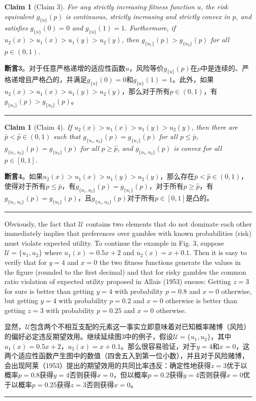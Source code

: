 \documentclass[12pt,a4paper]{article}
\newenvironment{original}
  {\par\noindent\color{black}\smallskip}
  {\par\smallskip}
\newenvironment{translation}
  {\par\noindent\color{blue!70!black}\smallskip}
  {\par\medskip\hrule\medskip}
\newtheorem{claim}[theorem]{Claim}
\begin{document}
\begin{claim}[Claim 3]
For any strictly increasing fitness function $u$, the risk equivalent $g_{\{u\}}(p)$ is continuous, strictly increasing and strictly convex in $p$, and satisfies $g_{\{u\}}(0) = 0$ and $g_{\{u\}}(1) = 1$. Furthermore, if $u_2(x) > u_1(x) > u_1(y) > u_2(y)$, then $g_{\{u_1\}}(p) > g_{\{u_2\}}(p)$ for all $p \in (0, 1)$.
\end{claim}
\begin{translation}
\textbf{断言3}。对于任意严格递增的适应性函数$u$，风险等价$g_{\{u\}}(p)$在$p$中是连续的、严格递增且严格凸的，并满足$g_{\{u\}}(0) = 0$和$g_{\{u\}}(1) = 1$。此外，如果$u_2(x) > u_1(x) > u_1(y) > u_2(y)$，那么对于所有$p \in (0, 1)$，有$g_{\{u_1\}}(p) > g_{\{u_2\}}(p)$。
\end{translation}

\begin{claim}[Claim 4]
If $u_2(x) > u_1(x) > u_1(y) > u_2(y)$, then there are $\bar{p} < \hat{p} \in (0, 1)$ such that $g_{\{u_1, u_2\}}(p) = g_{\{u_1\}}(p)$ for all $p \leq \bar{p}$, $g_{\{u_1, u_2\}}(p) = g_{\{u_2\}}(p)$ for all $p \geq \hat{p}$, and $g_{\{u_1, u_2\}}(p)$ is convex for all $p \in [0, 1]$.
\end{claim}
\begin{translation}
\textbf{断言4}。如果$u_2(x) > u_1(x) > u_1(y) > u_2(y)$，那么存在$\bar{p} < \hat{p} \in (0, 1)$，使得对于所有$p \leq \bar{p}$，有$g_{\{u_1, u_2\}}(p) = g_{\{u_1\}}(p)$，对于所有$p \geq \hat{p}$，有$g_{\{u_1, u_2\}}(p) = g_{\{u_2\}}(p)$，且$g_{\{u_1, u_2\}}(p)$对于所有$p \in [0, 1]$是凸的。
\end{translation}

\begin{original}
Obviously, the fact that $\mathcal{U}$ contains two elements that do not dominate each other immediately implies that preferences over gambles with known probabilities (risk) must violate expected utility. To continue the example in Fig. 3, suppose $\mathcal{U} = \{u_1, u_2\}$ where $u_1(x) = 0.5x + 2$ and $u_2(x) = x + 0.1$. Then it is easy to verify that for $y = 4$ and $x = 0$ the two fitness functions generate the values in the figure (rounded to the first decimal) and that for risky gambles the common ratio violation of expected utility proposed in Allais (1953) ensues: Getting $z = 3$ for sure is better than getting $y = 4$ with probability $p = 0.8$ and $x = 0$ otherwise, but getting $y = 4$ with probability $p = 0.2$ and $x = 0$ otherwise is better than getting $z = 3$ with probability $p = 0.25$ and $x = 0$ otherwise.
\end{original}
\begin{translation}
显然，$\mathcal{U}$包含两个不相互支配的元素这一事实立即意味着对已知概率赌博（风险）的偏好必定违反期望效用。继续延续图3中的例子，假设$\mathcal{U} = \{u_1, u_2\}$，其中$u_1(x) = 0.5x + 2$，$u_2(x) = x + 0.1$。那么很容易验证，对于$y = 4$和$x = 0$，这两个适应性函数产生图中的数值（四舍五入到第一位小数），并且对于风险赌博，会出现阿莱（1953）提出的期望效用的共同比率违反：确定性地获得$z = 3$优于以概率$p = 0.8$获得$y = 4$否则获得$x = 0$，但以概率$p = 0.2$获得$y = 4$否则获得$x = 0$优于以概率$p = 0.25$获得$z = 3$否则获得$x = 0$。
\end{translation}
\end{document}
